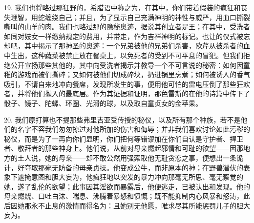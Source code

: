 19. 我们也将略过那狂野的，希腊语中称之为，在其中，你们带着假装的疯狂和丧失理智，用蛇缠绕自己；并且，为了显示自己充满神明的神性与威严，用血口撕裂嘶叫的山羊的肉。我们也略过那的隐秘奥迹，据说其创立者是王；在其中，受洗者如同对妓女一样缴纳规定的费用，并带走，作为吉祥神明的标记。也让的仪式被忘却吧，其中揭示了那神圣的奥迹：一个兄弟被他的兄弟们杀害，欧芹从被杀者的血中生出，这种蔬菜被禁止放在餐桌上，以免死者的受到不可平息的冒犯。但我们拒绝公开宣扬那些其他的，其中向受洗者揭示并教导一个不可言说的秘密：如何因童稚的游戏而被们撕碎；又如何被他们切成碎块，扔进锅里烹煮；如何被诱人的香气吸引，不请自来地冲向餐席，发现所发生的事，便用他可怕的雷电压倒了那些狂欢者，并将他们抛入的最底层。作为其证据和证明，那色雷斯的在他的诗篇中传下了骰子、镜子、陀螺、环圈、光滑的球，以及取自童贞女的金苹果。\par

20. 我们原打算也不提那些弗里吉亚受传授的秘仪，以及所有那个种族，若不是他们的名字不容我们匆匆掠过对他所加的伤害和侮辱；并非我们喜欢讨论如此污秽的秘仪，而是为了一再向你们显明，你们把何等错谬加在你们自认是守护者、捍卫者、敬拜者的那些神身上。他们说，从前对母亲燃起邪情和可耻的欲望——因那地方的土人说，她的母亲——却不敢公然用强索取他无耻贪恋之事，便想出一条诡计，好夺取那毫无防备的母亲贞操。他变成公牛，而非原本的神；在野兽潜伏的表象下遮掩意图和胆大妄为，他疯狂地以突发的暴力冲向那毫无所思、毫无察觉的她，遂了乱伦的欲望；此事因其淫欲而暴露后，他便逃走，已被认出和发现。他的母亲燃烧、口吐白沫、喘息、沸腾着暴怒和愤慨；既不能抑制内心风暴和怒涛，此后因她那永不止息的激情而得名为：且她别无他愿，唯求尽其所能惩罚儿子的胆大妄为。\par

